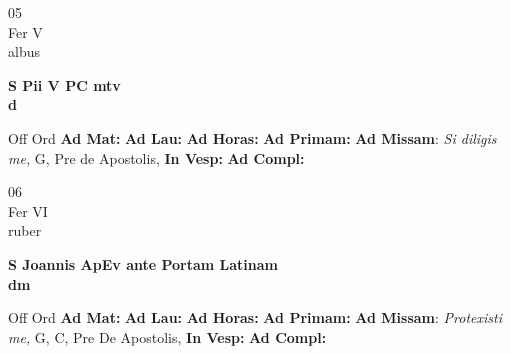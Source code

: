 \documentclass[10pt, openany]{book}
\begin{document}
        \begin{center}
            \begin{minipage}{3.5in}
                \vspace{2em}
                \begin{minipage}{0.5in}
                    {\Huge 05} \\
                    {\normalsize Fer V} \\
                    {\normalsize albus}
                \end{minipage}
                \begin{minipage}{3.0in}
                    \textbf{ \large S Pii V PC mtv \\
                    \textnormal{\normalsize d}} \\ 
                \end{minipage}
                \begin{justify}Off Ord
                    \textbf{Ad Mat: }
                    \textbf{Ad Lau: }
                    \textbf{Ad Horas: }
                    \textbf{Ad Primam: }\textbf{Ad Missam}: \textit{Si diligis me,} G, Pre de Apostolis,  
                    \textbf{In Vesp: }
                    \textbf{Ad Compl: }
                \end{justify}
            \end{minipage}
        \end{center}
    
        \begin{center}
            \begin{minipage}{3.5in}
                \vspace{2em}
                \begin{minipage}{0.5in}
                    {\Huge 06} \\
                    {\normalsize Fer VI} \\
                    {\normalsize ruber}
                \end{minipage}
                \begin{minipage}{3.0in}
                    \textbf{ \large S Joannis ApEv ante Portam Latinam \\
                    \textnormal{\normalsize dm}} \\ 
                \end{minipage}
                \begin{justify}Off Ord
                    \textbf{Ad Mat: }
                    \textbf{Ad Lau: }
                    \textbf{Ad Horas: }
                    \textbf{Ad Primam: }\textbf{Ad Missam}: \textit{Protexisti me,} G, C, Pre De Apostolis,  
                    \textbf{In Vesp: }
                    \textbf{Ad Compl: }
                \end{justify}
            \end{minipage}
        \end{center}
    
\end{document}
